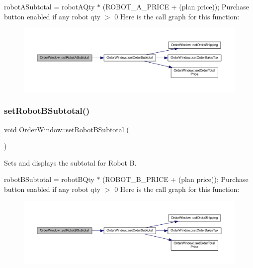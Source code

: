 robot\+A\+Subtotal = robot\+A\+Qty $\ast$ (R\+O\+B\+O\+T\+\_\+\+A\+\_\+\+P\+R\+I\+CE + (plan price)); Purchase button enabled if any robot qty $>$ 0 Here is the call graph for this function\+:\nopagebreak
\begin{figure}[H]
\begin{center}
\leavevmode
\includegraphics[width=350pt]{class_order_window_a4fec739fb9e3c2c06fdf8afa7d94a4f9_cgraph}
\end{center}
\end{figure}
\mbox{\label{class_order_window_aa575a53f391f6bc103e89f2bf2fce91e}} 
\subsubsection{\texorpdfstring{set\+Robot\+B\+Subtotal()}{setRobotBSubtotal()}}
{\footnotesize\ttfamily void Order\+Window\+::set\+Robot\+B\+Subtotal (\begin{DoxyParamCaption}{ }\end{DoxyParamCaption})}



Sets and displays the subtotal for Robot B. 

robot\+B\+Subtotal = robot\+B\+Qty $\ast$ (R\+O\+B\+O\+T\+\_\+\+B\+\_\+\+P\+R\+I\+CE + (plan price)); Purchase button enabled if any robot qty $>$ 0 Here is the call graph for this function\+:\nopagebreak
\begin{figure}[H]
\begin{center}
\leavevmode
\includegraphics[width=350pt]{class_order_window_aa575a53f391f6bc103e89f2bf2fce91e_cgraph}
\end{center}
\end{figure}
\mbox{\label{class_order_window_a5283f60b1a3076038b08160b37542fdc}} 
